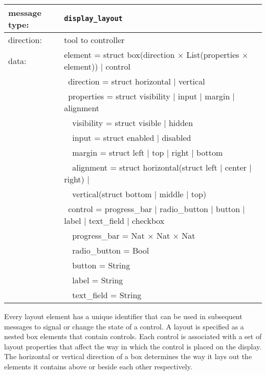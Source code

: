 \documentclass{article}
\newcommand{\msg}[1]{\texttt{#1}}
\begin{document}
   \begin{table}[H]
    \begin{center}
     \begin{tabular}{|ll|}
      \hline
       message type:   & \msg{display\_layout} \\
      \hline
       direction:      & tool to controller \\
       data:           & element = struct box(direction $\times$ List(properties $\times$ element)) $|$ control \\
                       & \ direction = struct horizontal $|$ vertical \\
                       & \ properties = struct visibility $|$ input $|$ margin $|$ alignment \\
                       & \ \ visibility = struct visible $|$ hidden \\
                       & \ \ input = struct enabled $|$ disabled \\
                       & \ \ margin = struct left $|$ top $|$ right $|$ bottom \\
                       & \ \ alignment = struct horizontal(struct left $|$ center $|$ right) $|$ \\
                       & \ \                    vertical(struct bottom $|$ middle $|$ top) \\
                       & \ control = progress\_bar $|$ radio\_button $|$ button $|$ label $|$ text\_field $|$ checkbox \\
                       & \ \ progress\_bar = Nat $\times$ Nat $\times$ Nat \\
                       & \ \ radio\_button = Bool \\
                       & \ \ button        = String \\
                       & \ \ label         = String \\
                       & \ \ text\_field   = String \\
      \hline
     \end{tabular}
    \end{center}
   \end{table}
   \vspace{-0.4cm}
   \noindent Every layout element has a unique identifier that can be used in
   subsequent messages to signal or change the state of a control. A layout is
   specified as a nested box elements that contain controls. Each control is
   associated with a set of layout properties that affect the way in which the
   control is placed on the display. The horizontal or vertical direction of a
   box determines the way it lays out the elements it contains above or beside
   each other respectively.
\end{document}
